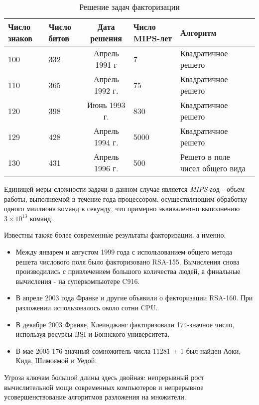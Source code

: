 \begin{table}[ht]
    \centering
    \begin{tabular}{@{}p{2.5cm}p{2.5cm}cp{2.5cm}p{4.5cm}@{}}
    \toprule
    \textbf{Число знаков} & \textbf{Число битов} & \textbf{Дата решения} & \textbf{Число MIPS-лет} & \textbf{Алгоритм} \\ \midrule
    100                              & 332                  & Апрель 1991 г         & 7                       & Квадратичное решето              \\
    110                              & 365                  & Апрель 1992 г.        & 75                      & Квадратичное решето              \\
    120                              & 398                  & Июнь 1993 г.          & 830                     & Квадратичное решето              \\
    129                              & 428                  & Апрель 1994 г.        & 5000                    & Квадратичное решето              \\
    130                              & 431                  & Апрель 1996 г.        & 500                     & Решето в поле чисел общего вида  \\ 
    \bottomrule
    \end{tabular}
    \caption{Решение задач факторизации}
    \label{table-prime-attacks}
  \end{table}

Единицей меры сложности задачи в данном случае является \textit{MIPS-го}д - объем работы, выполняемой в течение года процессором, осуществляющим обработку одного миллиона команд в секунду, что примерно эквивалентно выполнению {$3\times10^{13}$} команд.  
  
Известны также более современные результаты факторизации, а именно:  
    \begin{itemize}
      \item Между январем и августом 1999 года с использованием общего метода решета числового поля было факторизовано RSA-155. Вычисления снова производились с 
	привлечением большого количества людей, а финальные вычисления - на суперкомпьютере C916.
      \item В апреле 2003 года Франке и другие объявили о факторизации RSA-160. При разложении использовалось около сотни CPU.
      \item В декабре 2003 Франке, Клеинджанг факторизовали 174-значное число, используя ресурсы BSI и Боннского университета.
      \item В мае 2005 176-значный сомножитель числа 11281 + 1 был найден Аоки, Кида, Шимоямой и Уедой.
    \end{itemize}
  
Угроза ключам большой длины здесь двойная: непрерывный рост вычислительной мощи современных компьютеров и непрерывное 
  усовершенствование алгоритмов разложения на множители.



